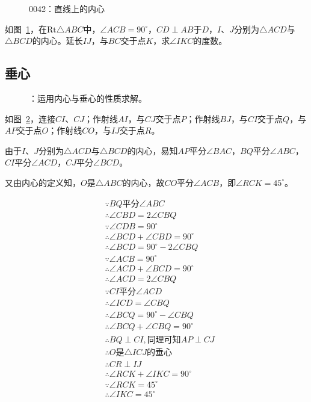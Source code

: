 

\begin{figure}[htbp]
  \centering
  \caption{0042：直线上的内心} \label{fig:0042}
\end{figure}

如图~\ref{fig:0042}，在$\mathrm{Rt}\triangle ABC$中，$\angle ACB = 90^\circ$，$CD \perp AB$于$D$，$I$、$J$分别为$\triangle ACD$与$\triangle BCD$的内心。延长$IJ$，与$BC$交于点$K$，求$\angle IKC$的度数。


\subsection{垂心} \label{subsec:0042-vert}

\begin{figure}[htbp]
  \centering
  \caption{：运用内心与垂心的性质求解。}
  \label{fig:0042-vert}
\end{figure}

如图~\ref{fig:0042-vert}，连接$CI$、$CJ$；作射线$AI$，与$CJ$交于点$P$；作射线$BJ$，与$CI$交于点$Q$，与$AP$交于点$O$；作射线$CO$，与$IJ$交于点$R$。

由于$I$、$J$分别为$\triangle ACD$与$\triangle BCD$的内心，易知$AP$平分$\angle BAC$，$BQ$平分$\angle ABC$，$CI$平分$\angle ACD$，$CJ$平分$\angle BCD$。

又由内心的定义知，$O$是$\triangle ABC$的内心，故$CO$平分$\angle ACB$，即$\angle RCK = 45^\circ$。

\begin{align*}
  &\because   BQ\text{平分}\angle ABC \\
  &\therefore \angle CBD = 2\angle CBQ \\
  &\because   \angle CDB = 90^\circ \\
  &\therefore \angle BCD + \angle CBD = 90^\circ \\
  &\therefore \angle BCD = 90^\circ - 2\angle CBQ \\
  &\because   \angle ACB = 90^\circ \\
  &\therefore \angle ACD + \angle BCD = 90^\circ \\
  &\therefore \angle ACD = 2\angle CBQ \\
  &\because   CI\text{平分}\angle ACD \\
  &\therefore \angle ICD = \angle CBQ \\
  &\therefore \angle BCQ = 90^\circ - \angle CBQ \\
  &\therefore \angle BCQ + \angle CBQ = 90^\circ \\
  &\therefore BQ \perp CI, \text{同理可知}AP \perp CJ \\
  &\therefore O\text{是}\triangle ICJ\text{的垂心} \\
  &\therefore CR \perp IJ \\
  &\therefore \angle RCK + \angle IKC = 90^\circ \\
  &\because   \angle RCK = 45^\circ \\
  &\therefore \angle IKC = 45^\circ \\
\end{align*}

